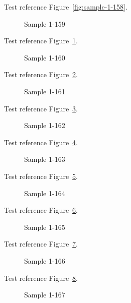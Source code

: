 Test reference Figure~\ref{fig:sample-1-158}.

\begin{figure}[tbhp]
\caption{Sample 1-159}
\label{fig:sample-1-159}
\end{figure}

Test reference Figure~\ref{fig:sample-1-159}.

\begin{figure}[tbhp]
\caption{Sample 1-160}
\label{fig:sample-1-160}
\end{figure}

Test reference Figure~\ref{fig:sample-1-160}.

\begin{figure}[tbhp]
\caption{Sample 1-161}
\label{fig:sample-1-161}
\end{figure}

Test reference Figure~\ref{fig:sample-1-161}.

\begin{figure}[tbhp]
\caption{Sample 1-162}
\label{fig:sample-1-162}
\end{figure}

Test reference Figure~\ref{fig:sample-1-162}.

\begin{figure}[tbhp]
\caption{Sample 1-163}
\label{fig:sample-1-163}
\end{figure}

Test reference Figure~\ref{fig:sample-1-163}.

\begin{figure}[tbhp]
\caption{Sample 1-164}
\label{fig:sample-1-164}
\end{figure}

Test reference Figure~\ref{fig:sample-1-164}.

\begin{figure}[tbhp]
\caption{Sample 1-165}
\label{fig:sample-1-165}
\end{figure}

Test reference Figure~\ref{fig:sample-1-165}.

\begin{figure}[tbhp]
\caption{Sample 1-166}
\label{fig:sample-1-166}
\end{figure}

Test reference Figure~\ref{fig:sample-1-166}.

\begin{figure}[tbhp]
\caption{Sample 1-167}
\label{fig:sample-1-167}
\end{figure}

